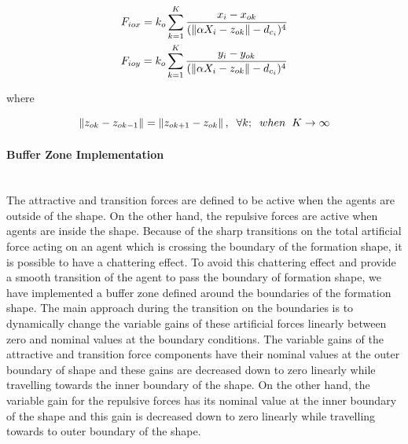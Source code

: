 \begin{align}
\begin{split}
& F_{iox} = k_o   \sum_{k=1}^{K} \frac{x_i -x_{ok}}{(\left\lVert\alpha X_i - z_{ok}\right\rVert -d_{c_i})^4}\\
& F_{ioy} = k_o   \sum_{k=1}^{K} \frac{y_i - y_{ok}}{(\left\lVert\alpha X_i - z_{ok}\right\rVert -d_{c_i})^4}\\
\end{split}
\end{align}
			
where

\begin{equation}
\left\lVert z_{ok}- z_{ok -1}\right\rVert = \left\lVert z_{ok+1} - z_{ok}\right\rVert, \hspace{0.2cm}  \forall k ;  \hspace{0.2cm} when  \hspace{0.2cm} K \to\infty
\end{equation}
			
\paragraph{Buffer Zone Implementation}\hspace{0pt} \\
The attractive and transition forces are defined to be active when the agents are outside of the shape. On the other hand, the repulsive forces are active when agents are inside the shape. Because of the sharp transitions on the total artificial force acting on an agent which is crossing the boundary of the formation shape, it is possible to have a chattering effect. To avoid this chattering effect and provide a smooth transition of the agent to pass the boundary of formation shape, we have implemented a buffer zone defined around the boundaries of the formation shape. The main approach during the transition on the boundaries is to dynamically change the variable gains of these artificial forces linearly between zero and nominal values at the boundary conditions. The variable gains of the attractive and transition force components have their nominal values at the outer boundary of shape and these gains are decreased down to zero linearly while travelling towards the inner boundary of the shape. On the other hand, the variable gain for the repulsive forces has its nominal value at the inner boundary of the shape and this gain is decreased down to zero linearly while travelling towards to outer boundary of the shape.
     
